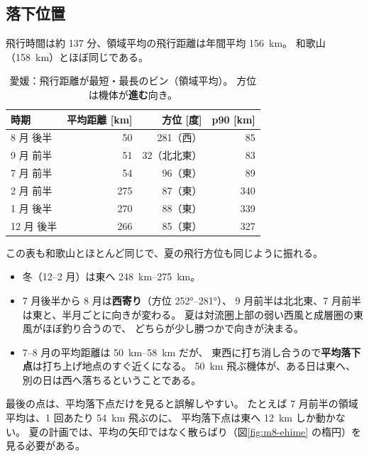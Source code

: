 \subsection{落下位置}



飛行時間は約 \num{137} 分、領域平均の飛行距離は年間平均 \SI{156}{\kilo\metre}。
和歌山（\SI{158}{\kilo\metre}）とほぼ同じである。

\begin{table}[H]
\centering
\caption{愛媛：飛行距離が最短・最長のビン（領域平均）。
方位は機体が\textbf{進む}向き。}
\begin{tabular}{lrrr}
\toprule
時期 & 平均距離 [\si{\kilo\metre}] & 方位 [度] & p90 [\si{\kilo\metre}] \\
\midrule
8 月 後半 & 50 & 281（西） & 85 \\
9 月 前半 & 51 & 32（北北東） & 83 \\
7 月 前半 & 54 & 96（東） & 89 \\
\midrule
2 月 前半 & 275 & 87（東） & 340 \\
1 月 後半 & 270 & 88（東） & 339 \\
12 月 後半 & 266 & 85（東） & 327 \\
\bottomrule
\end{tabular}
\end{table}

この表も和歌山とほとんど同じで、夏の飛行方位も同じように振れる。

\begin{itemize}
  \item 冬（12--2 月）は東へ \SIrange{248}{275}{\kilo\metre}。
  \item 7 月後半から 8 月は\textbf{西寄り}（方位 \ang{252}--\ang{281}）、
        9 月前半は北北東、7 月前半は東と、半月ごとに向きが変わる。
        夏は対流圏上部の弱い西風と成層圏の東風がほぼ釣り合うので、
        どちらが少し勝つかで向きが決まる。
  \item 7--8 月の平均距離は \SIrange{50}{58}{\kilo\metre} だが、
        東西に打ち消し合うので\textbf{平均落下点}は打ち上げ地点のすぐ近くになる。
        \SI{50}{\kilo\metre} 飛ぶ機体が、ある日は東へ、別の日は西へ落ちるということである。
\end{itemize}

最後の点は、平均落下点だけを見ると誤解しやすい。
たとえば 7 月前半の領域平均は、1 回あたり \SI{54}{\kilo\metre} 飛ぶのに、
平均落下点は東へ \SI{12}{\kilo\metre} しか動かない。
夏の計画では、平均の矢印ではなく散らばり（図\ref{fig:m8-ehime} の楕円）を見る必要がある。

